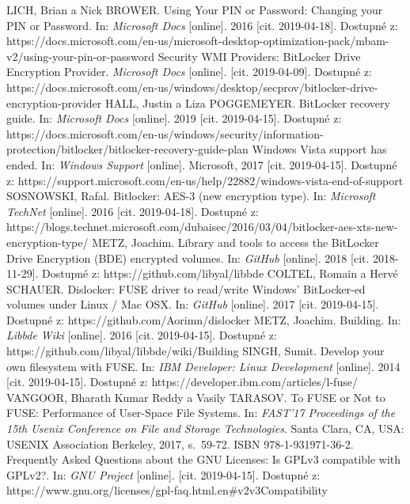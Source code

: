 \documentclass[a4paper,12pt]{article}
\begin{document}
{
LICH, Brian a Nick BROWER. Using Your PIN or Password: Changing your PIN or Password. In: \textit{Microsoft Docs} [online]. 2016 [cit. 2019-04-18]. Dostupné z: https://docs.microsoft.com/en-us/microsoft-desktop-optimization-pack/mbam-v2/using-your-pin-or-password
Security WMI Providers: BitLocker Drive Encryption Provider. \textit{Microsoft Docs} [online]. [cit. 2019-04-09]. Dostupné z: https://docs.microsoft.com/en-us/windows/desktop/secprov/bitlocker-drive-encryption-provider
HALL, Justin a Liza POGGEMEYER. BitLocker recovery guide. In: \textit{Microsoft Docs} [online]. 2019 [cit. 2019-04-15]. Dostupné z: https://docs.microsoft.com/en-us/windows/security/information-protection/bitlocker/bitlocker-recovery-guide-plan
Windows Vista support has ended. In: \textit{Windows Support} [online]. Microsoft, 2017 [cit. 2019-04-15]. Dostupné z: https://support.microsoft.com/en-us/help/22882/windows-vista-end-of-support
SOSNOWSKI, Rafal. Bitlocker: AES-3 (new encryption type). In: \textit{Microsoft TechNet} [online]. 2016 [cit. 2019-04-18]. Dostupné z: https://blogs.technet.microsoft.com/dubaisec/2016/03/04/bitlocker-aes-xts-new-encryption-type/
METZ, Joachim. Library and tools to access the BitLocker Drive Encryption (BDE) encrypted volumes. In: \textit{GitHub} [online]. 2018 [cit. 2018-11-29]. Dostupné z: https://github.com/libyal/libbde
COLTEL, Romain a Hervé SCHAUER. Dislocker: FUSE driver to read/write Windows' BitLocker-ed volumes under Linux / Mac OSX. In: \textit{GitHub} [online]. 2017 [cit. 2019-04-15]. Dostupné z: https://github.com/Aorimn/dislocker
METZ, Joachim. Building. In: \textit{Libbde Wiki} [online]. 2016 [cit. 2019-04-15]. Dostupné z: https://github.com/libyal/libbde/wiki/Building
SINGH, Sumit. Develop your own filesystem with FUSE. In: \textit{IBM Developer: Linux Development} [online]. 2014 [cit. 2019-04-15]. Dostupné z: https://developer.ibm.com/articles/l-fuse/
VANGOOR, Bharath Kumar Reddy a Vasily TARASOV. To FUSE or Not to FUSE: Performance of User-Space File Systems. In: \textit{FAST'17 Proceedings of the 15th Usenix Conference on File and Storage Technologies}. Santa Clara, CA, USA: USENIX Association Berkeley, 2017, s.~59-72. ISBN 978-1-931971-36-2.
Frequently Asked Questions about the GNU Licenses: Is GPLv3 compatible with GPLv2?. In: \textit{GNU Project} [online]. [cit. 2019-04-15]. Dostupné z: https://www.gnu.org/licenses/gpl-faq.html.en\#v2v3Compatibility
}
\end{document}
